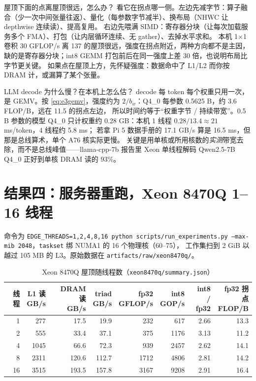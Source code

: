 \documentclass[11pt,a4paper]{ctexart}
\begin{document}
\begin{iqbox}{屋顶下面的点离屋顶很远，怎么办？}
看它在拐点哪一侧。左边先减字节：算子融合（少一次中间张量往返）、量化（每参数字节减半）、换布局（NHWC 让 depthwise 连续读）、提高复用。
右边先喂满 SIMD：寄存器分块（让每次加载服务多个 FMA）、打包（让内层循环连续、无 gather）、去掉水平求和。
本机 1×1 卷积 30 GFLOP/s 离 137 的屋顶很远，强度在拐点附近，两种方向都不是主因，缺的是寄存器分块；int8 GEMM 打包前后在同一强度上差 30 倍，也说明布局比字节更关键。
如果点在屋顶上方，先怀疑强度：数据命中了 L1/L2 而你按 DRAM 计，或漏算了某个张量。
\end{iqbox}

\begin{iqbox}{LLM decode 为什么慢？在本机上怎么估？}
decode 每 token 每个权重只用一次，是 GEMV。按 \cref{eq:e3gemv}，强度约为 $2/b_w$：Q4\_0 每参数 0.5625 B，约 3.6 FLOP/B，远在 11.5 的拐点左边，
所以时间约等于“权重字节 / 持续带宽”。0.5 B 参数的模型 Q4\_0 只计权重约 0.28 GB：本机 1 线程 $0.28/13.4 \approx 21$ ms/token，4 线程约 5.8 ms；
若拿 Pi 5 数据手册的 17.1 GB/s 算是 16.5 ms，但那是总线算术，单个 A76 核实际更慢。
关键是用单核或所用核数的\emph{实测}带宽去除，而不是总线峰值——llama-cpp-7b 报告里 Xeon 单线程解码 Qwen2.5-7B Q4\_0 正好到单核 DRAM 读的 93\%。
\end{iqbox}

\section{结果四：服务器重跑，Xeon 8470Q 1--16 线程}\label{sec:xeon}

命令为 \texttt{EDGE\_THREADS=1,2,4,8,16 python scripts/run\_experiments.py --max-mib 2048}，\texttt{taskset} 绑 NUMA1 的 16 个物理核（60--75），
工作集扫到 2 GiB 以越过 105 MB 的 L3。原始数据在 \nolinkurl{artifacts/raw/xeon8470q/}。

\begin{table}[H]
\centering\small
\caption{Xeon 8470Q 屋顶随线程数（\texttt{xeon8470q/summary.json}）}\label{tab:xeon}
\begin{tabular}{rrrrrrrr}
\toprule
线程 & \makecell{L1 读\\GB/s} & \makecell{DRAM 读\\GB/s} & \makecell{triad\\GB/s} & \makecell{fp32\\GFLOP/s} & \makecell{int8\\GOP/s} & \makecell{int8 /\\fp32} & \makecell{fp32 拐点\\FLOP/B} \\
\midrule
1 & 277 & 17.5 & 19.9 & 232 & 617 & 2.66 & 13.3 \\
2 & 555 & 33.4 & 37.1 & 375 & 1176 & 3.13 & 11.2 \\
4 & 1045 & 66.6 & 72.3 & 939 & 2457 & 2.62 & 14.1 \\
8 & 2311 & 120.6 & 112.7 & 1712 & 4806 & 2.81 & 14.2 \\
16 & 3515 & 193.5 & 157.8 & 3167 & 9208 & 2.91 & 16.4 \\
\bottomrule
\end{tabular}
\end{table}
\end{document}
